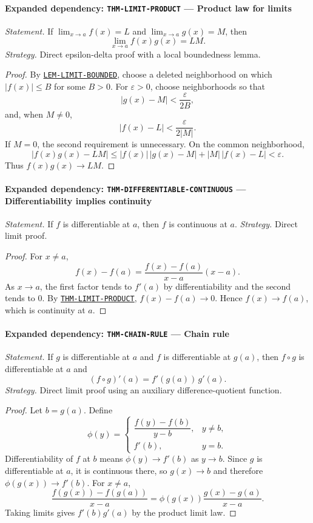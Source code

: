 \documentclass[10pt]{article}
\newcommand{\pidraw}[1]{\begingroup\urlstyle{tt}\nolinkurl{#1}\endgroup}
\newcommand{\pidref}[1]{\hyperref[prf:#1]{\pidraw{#1}}}
\newcommand{\pid}[1]{\pidref{#1}}
\theoremstyle{definition}
\theoremstyle{remark}
\begin{document}
\paragraph{Expanded dependency: \pidraw{THM-LIMIT-PRODUCT} --- Product law for limits}
\textit{Statement.} If $\lim_{x\to a}f(x)=L$ and $\lim_{x\to a}g(x)=M$, then
\[
\lim_{x\to a}f(x)g(x)=LM.
\]
\textit{Strategy.} Direct epsilon-delta proof with a local boundedness lemma.
\begin{proof}By \pid{LEM-LIMIT-BOUNDED}, choose a deleted neighborhood on which
$|f(x)|\le B$ for some $B>0$. For $\varepsilon>0$, choose neighborhoods so that
\[
|g(x)-M|<\frac{\varepsilon}{2B},
\]
and, when $M\ne0$,
\[
|f(x)-L|<\frac{\varepsilon}{2|M|}.
\]
If $M=0$, the second requirement is unnecessary. On the common neighborhood,
\[
|f(x)g(x)-LM|
\le |f(x)|\,|g(x)-M|+|M|\,|f(x)-L|<\varepsilon.
\]
Thus $f(x)g(x)\to LM$.\end{proof}

\paragraph{Expanded dependency: \pidraw{THM-DIFFERENTIABLE-CONTINUOUS} --- Differentiability implies continuity}
\textit{Statement.} If $f$ is differentiable at $a$, then $f$ is continuous at $a$.
\textit{Strategy.} Direct limit proof.
\begin{proof}For $x\ne a$,
\[
f(x)-f(a)=
\frac{f(x)-f(a)}{x-a}(x-a).
\]
As $x\to a$, the first factor tends to $f'(a)$ by differentiability and the
second tends to $0$. By \pid{THM-LIMIT-PRODUCT},
$f(x)-f(a)\to0$. Hence $f(x)\to f(a)$, which is continuity at $a$.\end{proof}

\paragraph{Expanded dependency: \pidraw{THM-CHAIN-RULE} --- Chain rule}
\textit{Statement.} If $g$ is differentiable at $a$ and $f$ is differentiable at $g(a)$, then $f\circ g$ is differentiable at $a$ and
\[
(f\circ g)'(a)=f'(g(a))\,g'(a).
\]
\textit{Strategy.} Direct limit proof using an auxiliary difference-quotient function.
\begin{proof}Let $b=g(a)$. Define
\[
\phi(y)=
\begin{cases}
\dfrac{f(y)-f(b)}{y-b},&y\ne b,\\[4pt]
f'(b),&y=b.
\end{cases}
\]
Differentiability of $f$ at $b$ means $\phi(y)\to f'(b)$ as $y\to b$.
Since $g$ is differentiable at $a$, it is continuous there, so $g(x)\to b$ and
therefore $\phi(g(x))\to f'(b)$. For $x\ne a$,
\[
\frac{f(g(x))-f(g(a))}{x-a}
=
\phi(g(x))\frac{g(x)-g(a)}{x-a}.
\]
Taking limits gives $f'(b)g'(a)$ by the product limit law.\end{proof}
\end{document}

